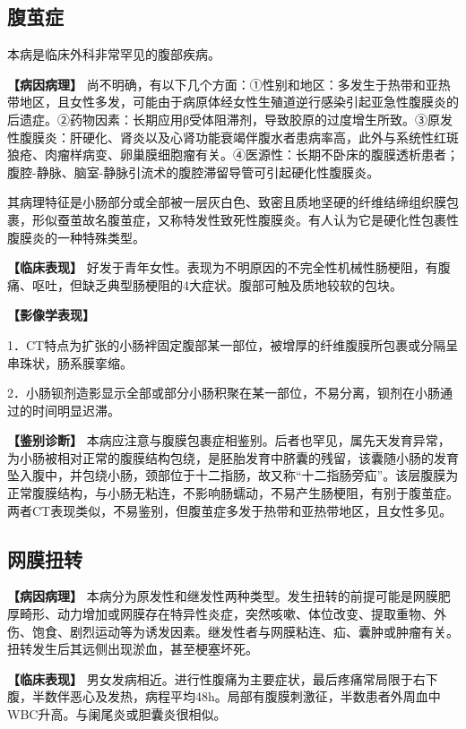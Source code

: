 \subsection{腹茧症}

本病是临床外科非常罕见的腹部疾病。

\textbf{【病因病理】}
尚不明确，有以下几个方面：①性别和地区：多发生于热带和亚热带地区，且女性多发，可能由于病原体经女性生殖道逆行感染引起亚急性腹膜炎的后遗症。②药物因素：长期应用β受体阻滞剂，导致胶原的过度增生所致。③原发性腹膜炎：肝硬化、肾炎以及心肾功能衰竭伴腹水者患病率高，此外与系统性红斑狼疮、肉瘤样病变、卵巢膜细胞瘤有关。④医源性：长期不卧床的腹膜透析患者；腹腔-静脉、脑室-静脉引流术的腹腔滞留导管可引起硬化性腹膜炎。

其病理特征是小肠部分或全部被一层灰白色、致密且质地坚硬的纤维结缔组织膜包裹，形似蚕茧故名腹茧症，又称特发性致死性腹膜炎。有人认为它是硬化性包裹性腹膜炎的一种特殊类型。

\textbf{【临床表现】}
好发于青年女性。表现为不明原因的不完全性机械性肠梗阻，有腹痛、呕吐，但缺乏典型肠梗阻的4大症状。腹部可触及质地较软的包块。

\textbf{【影像学表现】}

1．CT特点为扩张的小肠袢固定腹部某一部位，被增厚的纤维腹膜所包裹或分隔呈串珠状，肠系膜挛缩。

2．小肠钡剂造影显示全部或部分小肠积聚在某一部位，不易分离，钡剂在小肠通过的时间明显迟滞。

\textbf{【鉴别诊断】}
本病应注意与腹膜包裹症相鉴别。后者也罕见，属先天发育异常，为小肠被相对正常的腹膜结构包绕，是胚胎发育中脐囊的残留，该囊随小肠的发育坠入腹中，并包绕小肠，颈部位于十二指肠，故又称“十二指肠旁疝”。该层腹膜为正常腹膜结构，与小肠无粘连，不影响肠蠕动，不易产生肠梗阻，有别于腹茧症。两者CT表现类似，不易鉴别，但腹茧症多发于热带和亚热带地区，且女性多见。

\subsection{网膜扭转}

\textbf{【病因病理】}
本病分为原发性和继发性两种类型。发生扭转的前提可能是网膜肥厚畸形、动力增加或网膜存在特异性炎症，突然咳嗽、体位改变、提取重物、外伤、饱食、剧烈运动等为诱发因素。继发性者与网膜粘连、疝、囊肿或肿瘤有关。扭转发生后其远侧出现淤血，甚至梗塞坏死。

\textbf{【临床表现】}
男女发病相近。进行性腹痛为主要症状，最后疼痛常局限于右下腹，半数伴恶心及发热，病程平均48h。局部有腹膜刺激征，半数患者外周血中WBC升高。与阑尾炎或胆囊炎很相似。

